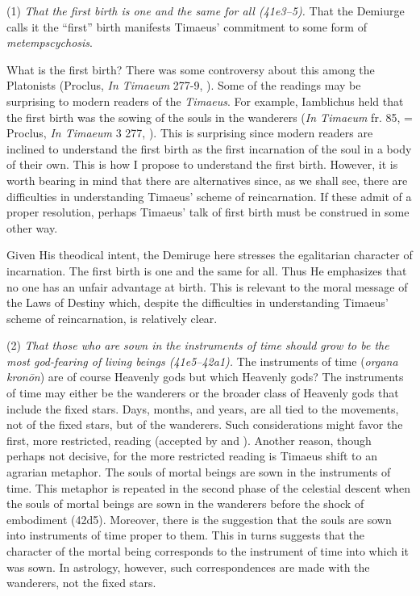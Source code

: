 (1) \emph{That the first birth is one and the same for all (41e3--5).} That the Demiurge calls it the ``first'' birth manifests Timaeus' commitment to some form of \emph{metempscychosis}.

What is the first birth? There was some controversy about this among the Platonists (Proclus, \emph{In Timaeum} 277-9, \citealt{Diehl:1903re}). Some of the readings may be surprising to modern readers of the \emph{Timaeus}. For example, Iamblichus held that the first birth was the sowing of the souls in the wanderers (\emph{In Timaeum} fr. 85, \citealt{Dillon:1973qv} = Proclus, \emph{In Timaeum} 3 277, \citealt{Diehl:1903re}). This is surprising since modern readers are inclined to understand the first birth as the first incarnation of the soul in a body of their own. This is how I propose to understand the first birth. However, it is worth bearing in mind that there are alternatives since, as we shall see, there are difficulties in understanding Timaeus' scheme of reincarnation. If these admit of a proper resolution, perhaps Timaeus' talk of first birth must be construed in some other way.

Given His theodical intent, the Demiruge here stresses the egalitarian character of incarnation. The first birth is one and the same for all. Thus He emphasizes that no one has an unfair advantage at birth. This is relevant to the moral message of the Laws of Destiny which, despite the difficulties in understanding Timaeus' scheme of reincarnation, is relatively clear.

(2) \emph{That those who are sown in the instruments of time should grow to be the most god-fearing of living beings (41e5--42a1).} The instruments of time (\emph{organa kronōn}) are of course Heavenly gods but which Heavenly gods? The instruments of time may either be the wanderers or the broader class of Heavenly gods that include the fixed stars. Days, months, and years, are all tied to the movements, not of the fixed stars, but of the wanderers. Such considerations might favor the first, more restricted, reading (accepted by \citealt[143 n4]{Archer-Hind:1888qd} and \citealt[258--9]{Taylor:1928qb}). Another reason, though perhaps not decisive, for the more restricted reading is Timaeus shift to an agrarian metaphor. The souls of mortal beings are sown in the instruments of time. This metaphor is repeated in the second phase of the celestial descent when the souls of mortal beings are sown in the wanderers before the shock of embodiment (42d5). Moreover, there is the suggestion that the souls are sown into instruments of time proper to them. This in turns suggests that the character of the mortal being corresponds to the instrument of time into which it was sown. In astrology, however, such correspondences are made with the wanderers, not the fixed stars.

